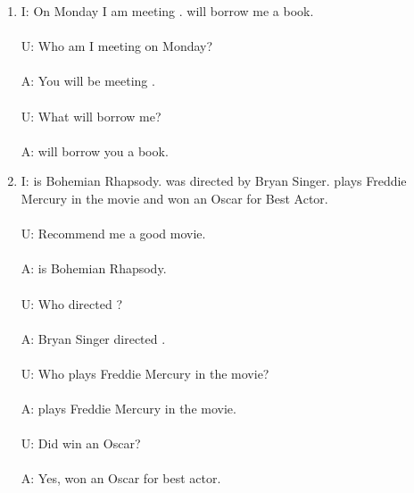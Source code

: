 \documentclass[letterpaper,12pt, dvipsnames, dateno]{article}
\begin{document}
\begin{enumerate}[label=\textbf{\arabic*}]
{    
    } 
    \item{
        I: On Monday I am meeting .  will borrow me a book.\\ \\
        U: Who am I meeting on Monday? \\ \\
        A: You will be meeting  . \\ \\
        U: What will  borrow me? \\ \\
        A:  will borrow you a book.
        
    } 
    \item{
        I:  is Bohemian Rhapsody. was directed by Bryan Singer.  plays Freddie Mercury in the movie and  won an Oscar for Best Actor.\\ \\
        U: Recommend me a good movie. \\ \\
        A:  is Bohemian Rhapsody. \\ \\
        U: Who directed ? \\ \\
        A: Bryan Singer directed .\\ \\ 
        U: Who plays Freddie Mercury in the movie? \\ \\ 
        A:  plays Freddie Mercury in the movie. \\ \\
        U: Did  win an Oscar? \\ \\
        A: Yes,  won an Oscar for best actor.
    }
           

\end{enumerate}
\end{document}

